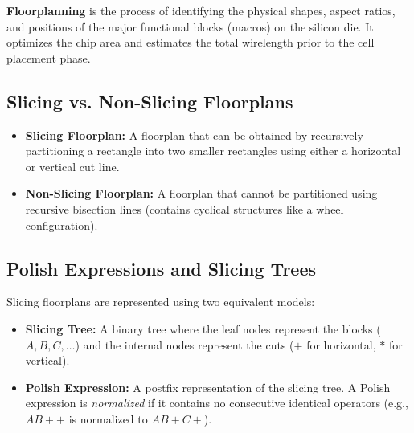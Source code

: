 \documentclass[12pt,a4paper]{article}
\begin{document}
\begin{tcolorbox}[defbox, title={Circuit Floorplanning}]
  \textbf{Floorplanning} is the process of identifying the physical shapes, aspect ratios, and positions of the major functional blocks (macros) on the silicon die. It optimizes the chip area and estimates the total wirelength prior to the cell placement phase.
\end{tcolorbox}

\subsection{Slicing vs. Non-Slicing Floorplans}
\begin{itemize}[leftmargin=*, itemsep=2pt]
  \item \textbf{Slicing Floorplan:} A floorplan that can be obtained by recursively partitioning a rectangle into two smaller rectangles using either a horizontal or vertical cut line.
  \item \textbf{Non-Slicing Floorplan:} A floorplan that cannot be partitioned using recursive bisection lines (contains cyclical structures like a wheel configuration).
\end{itemize}

\subsection{Polish Expressions and Slicing Trees}
Slicing floorplans are represented using two equivalent models:
\begin{itemize}[leftmargin=*, itemsep=2pt]
  \item \textbf{Slicing Tree:} A binary tree where the leaf nodes represent the blocks ($A, B, C, \dots$) and the internal nodes represent the cuts ($+$ for horizontal, $*$ for vertical).
  \item \textbf{Polish Expression:} A postfix representation of the slicing tree. A Polish expression is \textit{normalized} if it contains no consecutive identical operators (e.g., $AB++$ is normalized to $AB+C+$).
\end{itemize}
\end{document}
